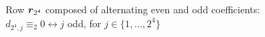 
\begin{figure}[p]

    \noindent{}

    \captionsetup{singlelinecheck=off}
    \caption[Row $\vect{r}_{2^{4}}$ of $\mathcal{C}_{\equiv_{2}}$]
        {Row $\vect{r}_{2^{4}}$ composed of alternating even and odd coefficients:
            $d_{2^{4},j}\equiv_{2}0 \leftrightarrow j$ odd,
                for $j\in\lbrace1,\ldots,2^{4} \rbrace$ }

    \label{fig:catalan-alternating-row}

\end{figure}
